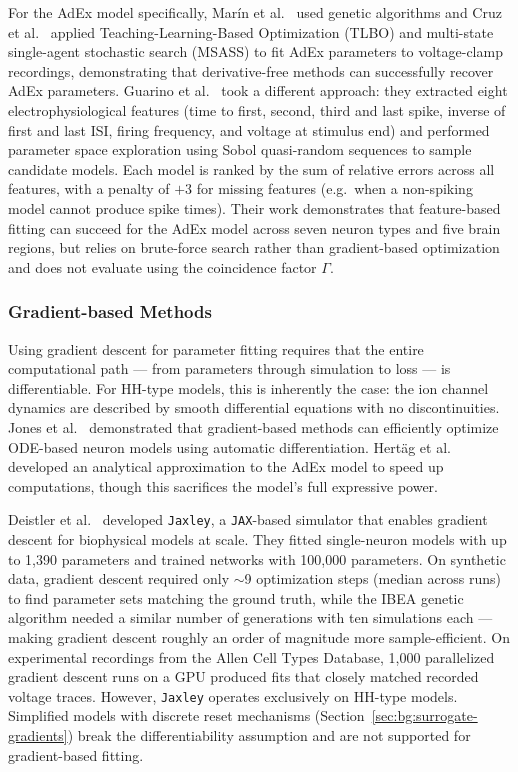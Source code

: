 For the \gls{AdEx} model specifically, Mar\'in et al.\ \cite{Marin2020} used genetic algorithms and Cruz et al.\ \cite{Cruz2021} applied Teaching-Learning-Based Optimization (TLBO) and multi-state single-agent stochastic search (MSASS) to fit \gls{AdEx} parameters to voltage-clamp recordings, demonstrating that derivative-free methods can successfully recover \gls{AdEx} parameters.
Guarino et al.\ \cite{Guarino2025} took a different approach: they extracted eight electrophysiological features (time to first, second, third and last spike, inverse of first and last \gls{ISI}, firing frequency, and voltage at stimulus end) and performed parameter space exploration using Sobol quasi-random sequences to sample candidate models.
Each model is ranked by the sum of relative errors across all features, with a penalty of $+3$ for missing features (e.g.\ when a non-spiking model cannot produce spike times).
Their work demonstrates that feature-based fitting can succeed for the \gls{AdEx} model across seven neuron types and five brain regions, but relies on brute-force search rather than gradient-based optimization and does not evaluate using the coincidence factor $\Gamma$.

\subsubsection{Gradient-based Methods}\label{sec:rw:param-estimation:gbmethod}
Using gradient descent for parameter fitting requires that the entire computational path --- from parameters through simulation to loss --- is differentiable.
For \gls{HH}-type models, this is inherently the case: the ion channel dynamics are described by smooth differential equations with no discontinuities.
Jones et al.\ \cite{Jones2024} demonstrated that gradient-based methods can efficiently optimize ODE-based neuron models using automatic differentiation.
Hertäg et al.\ \cite{Hertag2011} developed an analytical approximation to the \gls{AdEx} model to speed up computations, though this sacrifices the model's full expressive power.

Deistler et al.\ \cite{Deistler2025} developed \texttt{Jaxley}, a \texttt{JAX}-based simulator that enables gradient descent for biophysical models at scale.
They fitted single-neuron models with up to 1,390 parameters and trained networks with 100,000 parameters.
On synthetic data, gradient descent required only $\sim$9 optimization steps (median across runs) to find parameter sets matching the ground truth, while the IBEA genetic algorithm needed a similar number of generations with ten simulations each --- making gradient descent roughly an order of magnitude more sample-efficient.
On experimental recordings from the Allen Cell Types Database, 1,000 parallelized gradient descent runs on a GPU produced fits that closely matched recorded voltage traces.
However, \texttt{Jaxley} operates exclusively on \gls{HH}-type models.
Simplified models with discrete reset mechanisms (Section~\ref{sec:bg:surrogate-gradients}) break the differentiability assumption and are not supported for gradient-based fitting.

